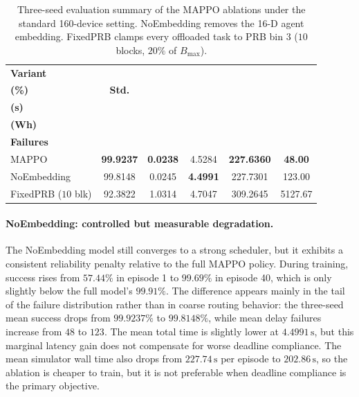 \begin{table}[htbp]
    \centering
    \small
    \setlength{\tabcolsep}{9pt}
    \renewcommand{\arraystretch}{1.15}
    \begin{tabular}{@{}lccccc@{}}
        \hline
        \textbf{Variant} & \shortstack{\textbf{Success}\\\textbf{(\%)}} & \textbf{Std.} & \shortstack{\textbf{Total Time}\\\textbf{(s)}} & \shortstack{\textbf{Energy}\\\textbf{(Wh)}} & \shortstack{\textbf{Delay}\\\textbf{Failures}} \\
        \hline
        MAPPO & \textbf{99.9237} & \textbf{0.0238} & 4.5284 & \textbf{227.6360} & \textbf{48.00} \\
        NoEmbedding & 99.8148 & 0.0245 & \textbf{4.4991} & 227.7301 & 123.00 \\
        FixedPRB (\(10\) blk) & 92.3822 & 1.0314 & 4.7047 & 309.2645 & 5127.67 \\
        \hline
    \end{tabular}
    \caption{Three-seed evaluation summary of the MAPPO ablations under the standard 160-device setting. NoEmbedding removes the 16-D agent embedding. FixedPRB clamps every offloaded task to PRB bin 3 (\(10\) blocks, \(20\%\) of \(B_{\max}\)).}
    \label{tab:mappo-ablation-summary}
\end{table}

\paragraph{NoEmbedding: controlled but measurable degradation.}
The NoEmbedding model still converges to a strong scheduler, but it exhibits a consistent reliability penalty relative to the full MAPPO policy. During training, success rises from \(57.44\%\) in episode 1 to \(99.69\%\) in episode 40, which is only slightly below the full model's \(99.91\%\). The difference appears mainly in the tail of the failure distribution rather than in coarse routing behavior: the three-seed mean success drops from \(99.9237\%\) to \(99.8148\%\), while mean delay failures increase from \(48\) to \(123\). The mean total time is slightly lower at \(4.4991\,\mathrm{s}\), but this marginal latency gain does not compensate for worse deadline compliance. The mean simulator wall time also drops from \(227.74\,\mathrm{s}\) per episode to \(202.86\,\mathrm{s}\), so the ablation is cheaper to train, but it is not preferable when deadline compliance is the primary objective.

